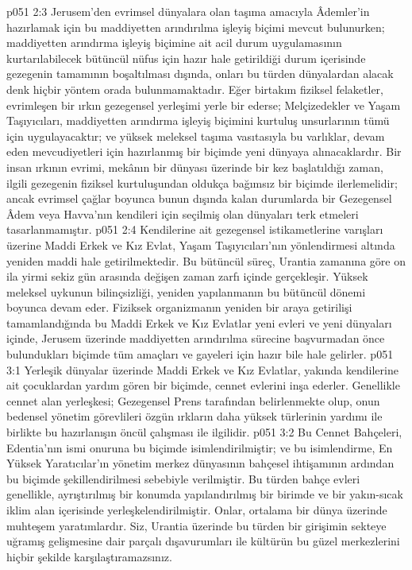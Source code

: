 \vs p051 2:3 Jerusem’den evrimsel dünyalara olan taşıma amacıyla Âdemler’in hazırlamak için bu maddiyetten arındırılma işleyiş biçimi mevcut bulunurken; maddiyetten arındırma işleyiş biçimine ait acil durum uygulamasının kurtarılabilecek bütüncül nüfus için hazır hale getirildiği durum içerisinde gezegenin tamamının boşaltılması dışında, onları bu türden dünyalardan alacak denk hiçbir yöntem orada bulunmamaktadır. Eğer birtakım fiziksel felaketler, evrimleşen bir ırkın gezegensel yerleşimi yerle bir ederse; Melçizedekler ve Yaşam Taşıyıcıları, maddiyetten arındırma işleyiş biçimini kurtuluş unsurlarının tümü için uygulayacaktır; ve yüksek meleksel taşıma vasıtasıyla bu varlıklar, devam eden mevcudiyetleri için hazırlanmış bir biçimde yeni dünyaya alınacaklardır. Bir insan ırkının evrimi, mekânın bir dünyası üzerinde bir kez başlatıldığı zaman, ilgili gezegenin fiziksel kurtuluşundan oldukça bağımsız bir biçimde ilerlemelidir; ancak evrimsel çağlar boyunca bunun dışında kalan durumlarda bir Gezegensel Âdem veya Havva’nın kendileri için seçilmiş olan dünyaları terk etmeleri tasarlanmamıştır.
\vs p051 2:4 Kendilerine ait gezegensel istikametlerine varışları üzerine Maddi Erkek ve Kız Evlat, Yaşam Taşıyıcıları’nın yönlendirmesi altında yeniden maddi hale getirilmektedir. Bu bütüncül süreç, Urantia zamanına göre on ila yirmi sekiz gün arasında değişen zaman zarfı içinde gerçekleşir. Yüksek meleksel uykunun bilinçsizliği, yeniden yapılanmanın bu bütüncül dönemi boyunca devam eder. Fiziksek organizmanın yeniden bir araya getirilişi tamamlandığında bu Maddi Erkek ve Kız Evlatlar yeni evleri ve yeni dünyaları içinde, Jerusem üzerinde maddiyetten arındırılma sürecine başvurmadan önce bulundukları biçimde tüm amaçları ve gayeleri için hazır bile hale gelirler.
\vs p051 3:1 Yerleşik dünyalar üzerinde Maddi Erkek ve Kız Evlatlar, yakında kendilerine ait çocuklardan yardım gören bir biçimde, cennet evlerini inşa ederler. Genellikle cennet alan yerleşkesi; Gezegensel Prens tarafından belirlenmekte olup, onun bedensel yönetim görevlileri özgün ırkların daha yüksek türlerinin yardımı ile birlikte bu hazırlanışın öncül çalışması ile ilgilidir.
\vs p051 3:2 Bu Cennet Bahçeleri, Edentia’nın ismi onuruna bu biçimde isimlendirilmiştir; ve bu isimlendirme, En Yüksek Yaratıcılar’ın yönetim merkez dünyasının bahçesel ihtişamının ardından bu biçimde şekillendirilmesi sebebiyle verilmiştir. Bu türden bahçe evleri genellikle, ayrıştırılmış bir konumda yapılandırılmış bir birimde ve bir yakın\hyp{}sıcak iklim alan içerisinde yerleşkelendirilmiştir. Onlar, ortalama bir dünya üzerinde muhteşem yaratımlardır. Siz, Urantia üzerinde bu türden bir girişimin sekteye uğramış gelişmesine dair parçalı dışavurumları ile kültürün bu güzel merkezlerini hiçbir şekilde karşılaştıramazsınız.
